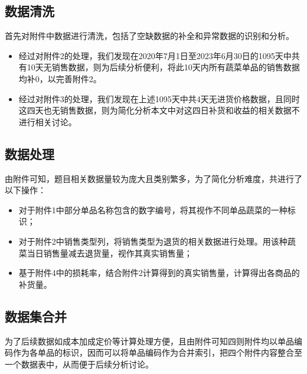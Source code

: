\documentclass{my_paper}
\begin{document}
\subsection{数据清洗}
首先对附件中数据进行清洗，包括了空缺数据的补全和异常数据的识别和分析。\par
\begin{itemize}
    \item 经过对附件2的处理，我们发现在2020年7月1日至2023年6月30日的1095天中共有10天无销售数据，则为后续分析便利，将此10天内所有蔬菜单品的销售数据均补0，以完善附件2。
    \item 经过对附件3的处理，我们发现在上述1095天中共4天无进货价格数据，且同时这四天也无销售数据，则为简化分析本文中对这四日补货和收益的相关数据不进行相关讨论。
\end{itemize}
\subsection{数据处理}
由附件可知，题目相关数据量较为庞大且类别繁多，为了简化分析难度，共进行了以下操作：
\begin{itemize}
    \item 对于附件1中部分单品名称包含的数字编号，将其视作不同单品蔬菜的一种标识；
    \item 对于附件2中销售类型列，将销售类型为退货的相关数据进行处理。用该种蔬菜当日销售量减去退货量，视作其真实销售量；
    \item 基于附件4中的损耗率，结合附件2计算得到的真实销售量，计算得出各商品的补货量。
\end{itemize}
\subsection{数据集合并}
为了后续数据如成本加成定价等计算处理方便，且由附件可知四则附件均以单品编码作为各单品的标识，因而可以将单品编码作为合并索引，把四个附件内容整合至一个数据表中，从而便于后续分析讨论。
\end{document}
